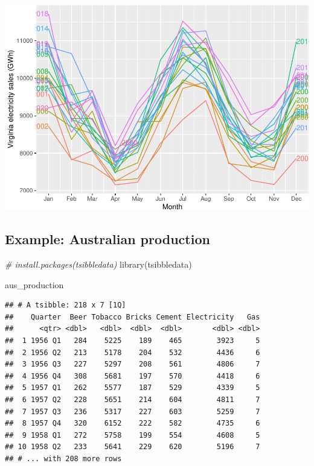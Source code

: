 \documentclass[
]{book}
\newenvironment{Shaded}{\begin{snugshade}}{\end{snugshade}}
\newcommand{\CommentTok}[1]{\textcolor[rgb]{0.56,0.35,0.01}{\textit{#1}}}
\newcommand{\FunctionTok}[1]{\textcolor[rgb]{0.00,0.00,0.00}{#1}}
\newcommand{\NormalTok}[1]{#1}
\begin{document}
\includegraphics{graphics/unnamed-chunk-16-1.pdf}

\hypertarget{example-australian-production}{%
\subsection{Example: Australian production}\label{example-australian-production}}

\begin{Shaded}
\begin{Highlighting}[]
\CommentTok{\# install.packages(\textquotesingle{}tsibbledata\textquotesingle{})}
\FunctionTok{library}\NormalTok{(tsibbledata)}

\NormalTok{aus\_production}
\end{Highlighting}
\end{Shaded}

\begin{verbatim}
## # A tsibble: 218 x 7 [1Q]
##    Quarter  Beer Tobacco Bricks Cement Electricity   Gas
##      <qtr> <dbl>   <dbl>  <dbl>  <dbl>       <dbl> <dbl>
##  1 1956 Q1   284    5225    189    465        3923     5
##  2 1956 Q2   213    5178    204    532        4436     6
##  3 1956 Q3   227    5297    208    561        4806     7
##  4 1956 Q4   308    5681    197    570        4418     6
##  5 1957 Q1   262    5577    187    529        4339     5
##  6 1957 Q2   228    5651    214    604        4811     7
##  7 1957 Q3   236    5317    227    603        5259     7
##  8 1957 Q4   320    6152    222    582        4735     6
##  9 1958 Q1   272    5758    199    554        4608     5
## 10 1958 Q2   233    5641    229    620        5196     7
## # ... with 208 more rows
\end{verbatim}
\end{document}
